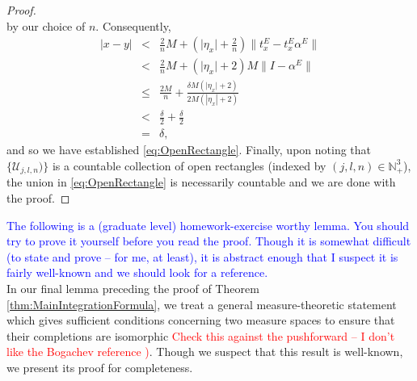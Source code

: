 \documentclass[11pt]{article}
\theoremstyle{theorem}
\begin{document}
\begin{proof}
\begin{equation*}
\end{equation*}
by our choice of $n$. Consequently,
\begin{eqnarray*}
    \vert x - y \vert 
    &< & \frac{2}{n} M+ \left( \vert \eta_x \vert + \frac{2}{n} \right) \|{t_x^E -   t_x^E \alpha^E}\|   \\ 
    &<& \frac{2}{n}M + \left( \vert \eta_x \vert + 2 \right)M\| I - \alpha^E\| \\
    &\leq&  \frac{2M }{n} +  \frac{\delta M \left( \vert \eta_x \vert + 2\right) }{2M (| \eta_x | + 2)}  \\
    &<& \frac{\delta}{2} + \frac{\delta}{2} \\
    &=& \delta,
\end{eqnarray*}
and so we have established \eqref{eq:OpenRectangle}. Finally, upon noting that $\{\mathcal{U}_{j,l,n})\}$ is a countable collection of open rectangles (indexed by $(j,l,n)\in\mathbb{N}_+^3$), the union in \eqref{eq:OpenRectangle} is necessarily countable and we are done with the proof.
\end{proof}

\noindent \textcolor{blue}{The following is a (graduate level) homework-exercise worthy lemma. You should try to prove it yourself before you read the proof. Though it is somewhat difficult (to state and prove -- for me, at least), it is abstract enough that I suspect it is fairly well-known and we should look for a reference.}\\

\noindent In our final lemma preceding the proof of Theorem \ref{thm:MainIntegrationFormula}, we treat a general measure-theoretic statement which gives sufficient conditions concerning two measure spaces to ensure that their completions are isomorphic \textcolor{red}{Check this against the pushforward -- I don't like the Bogachev reference \cite{Bogachev2007})}. Though we suspect that this result is well-known, we present its proof for completeness.
\end{document}
